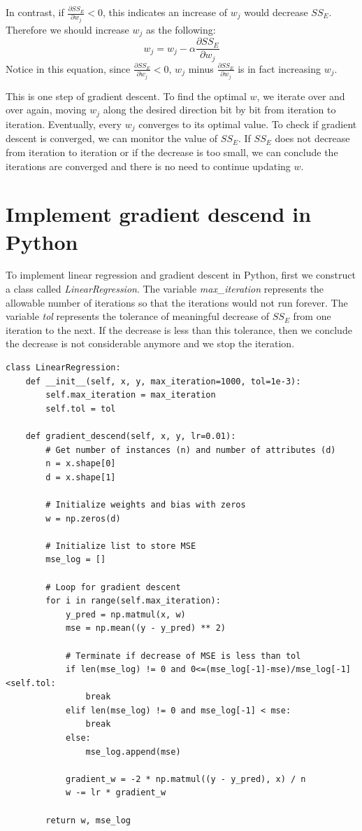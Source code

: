 \documentclass[
	letterpaper
]{article}
\begin{document}
In contrast, if $\frac{\partial SS_E}{\partial w_j} < 0$, this indicates an increase of $w_j$ would decrease $SS_E$.
Therefore we should increase $w_j$ as the following:
\begin{equation}
w_j = w_j - \alpha \frac{\partial SS_E}{\partial w_j} 
\end{equation}
Notice in this equation, since $\frac{\partial SS_E}{\partial w_j} < 0$, $w_j$ minus $\frac{\partial SS_E}{\partial w_j}$ is in fact increasing $w_j$.

This is one step of gradient descent. 
To find the optimal $w$, we iterate over and over again, moving $w_j$ along the desired direction bit by bit from iteration to iteration.
Eventually, every $w_j$ converges to its optimal value.
To check if gradient descent is converged, we can monitor the value of $SS_E$.
If $SS_E$ does not decrease from iteration to iteration or if the decrease is too small, we can conclude the iterations are converged and there is no need to continue updating $w$.

\section{Implement gradient descend in Python}
To implement linear regression and gradient descent in Python, first we construct a class called \textit{LinearRegression}.
The variable \textit{max\_iteration} represents the allowable number of iterations so that the iterations would not run forever.
The variable \textit{tol} represents the tolerance of meaningful decrease of $SS_E$ from one iteration to the next.
If the decrease is less than this tolerance, then we conclude the decrease is not considerable anymore and we stop the iteration.
\begin{lstlisting}
class LinearRegression:
    def __init__(self, x, y, max_iteration=1000, tol=1e-3):
        self.max_iteration = max_iteration
        self.tol = tol
        
    def gradient_descend(self, x, y, lr=0.01):
        # Get number of instances (n) and number of attributes (d)
        n = x.shape[0]
        d = x.shape[1]

        # Initialize weights and bias with zeros
        w = np.zeros(d)

        # Initialize list to store MSE
        mse_log = []

        # Loop for gradient descent
        for i in range(self.max_iteration):
            y_pred = np.matmul(x, w)
            mse = np.mean((y - y_pred) ** 2)

            # Terminate if decrease of MSE is less than tol
            if len(mse_log) != 0 and 0<=(mse_log[-1]-mse)/mse_log[-1]<self.tol:
                break
            elif len(mse_log) != 0 and mse_log[-1] < mse:
                break
            else:
                mse_log.append(mse)

            gradient_w = -2 * np.matmul((y - y_pred), x) / n
            w -= lr * gradient_w

        return w, mse_log
\end{lstlisting}
\end{document}
